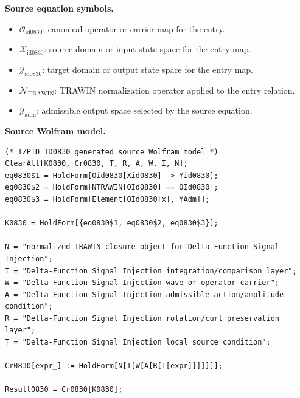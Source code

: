 \begin{minipage}[t]{0.49\linewidth}
\begingroup
\small
\raggedright
\textbf{Source equation symbols.}\par
\begin{itemize}[leftmargin=1.35em,itemsep=1pt,topsep=1pt,parsep=0pt]
    \item $\mathcal{O}_{\mathrm{id0830}}$: canonical operator or carrier map for the entry.
    \item $\mathcal{X}_{\mathrm{id0830}}$: source domain or input state space for the entry map.
    \item $\mathcal{Y}_{\mathrm{id0830}}$: target domain or output state space for the entry map.
    \item $\mathcal{N}_{\mathrm{TRAWIN}}$: TRAWIN normalization operator applied to the entry relation.
    \item $\mathcal{Y}_{\mathrm{adm}}$: admissible output space selected by the source equation.
\end{itemize}
\endgroup
\end{minipage}\hfill
\begin{minipage}[t]{0.47\linewidth}
\begingroup
\scriptsize
\raggedright
\textbf{Source Wolfram model.}\par
\begin{Verbatim}[fontsize=\tiny,breaklines=true,breakanywhere=true]
(* TZPID ID0830 generated source Wolfram model *)
ClearAll[K0830, Cr0830, T, R, A, W, I, N];
eq0830$1 = HoldForm[Oid0830[Xid0830] -> Yid0830];
eq0830$2 = HoldForm[NTRAWIN[OId0830] == OId0830];
eq0830$3 = HoldForm[Element[OId0830[x], YAdm]];

K0830 = HoldForm[{eq0830$1, eq0830$2, eq0830$3}];

N = "normalized TRAWIN closure object for Delta-Function Signal Injection";
I = "Delta-Function Signal Injection integration/comparison layer";
W = "Delta-Function Signal Injection wave or operator carrier";
A = "Delta-Function Signal Injection admissible action/amplitude condition";
R = "Delta-Function Signal Injection rotation/curl preservation layer";
T = "Delta-Function Signal Injection local source condition";

Cr0830[expr_] := HoldForm[N[I[W[A[R[T[expr]]]]]]];

Result0830 = Cr0830[K0830];
\end{Verbatim}
\endgroup
\end{minipage}

